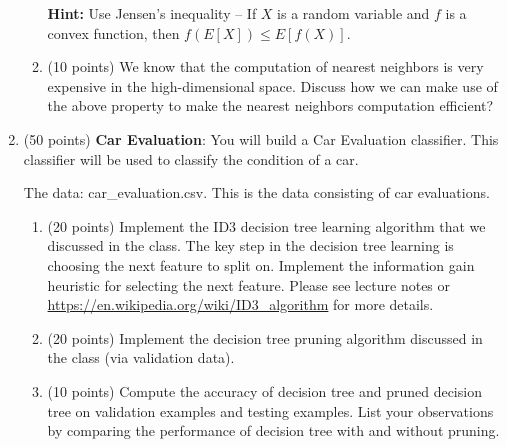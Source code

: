 \documentclass[11pt]{article}
\begin{document}
\begin{enumerate}
\begin{enumerate}
    \textbf{Hint: } Use Jensen’s inequality – If $X$ is a random
    variable and $f$ is a convex function, then $f(E[X]) \le
    E[f(X)]$.

    
    \item (10 points) We know that the computation of nearest
    neighbors is very expensive in the high-dimensional space.
    Discuss how we can make use of the above property to make the
    nearest neighbors computation efficient?


\end{enumerate}

\item (50 points) \textbf{Car Evaluation}: You will
build a Car Evaluation classifier. This classifier will be
used to classify the condition of a car.

The data: car\_evaluation.csv. This is the data
consisting of car evaluations. 

\begin{enumerate}
\item (20 points) Implement the ID3 decision tree learning
algorithm that we discussed in the class. The key step in the
decision tree learning is choosing the next feature to split on.
Implement the information gain heuristic for selecting the next
feature. Please see lecture notes or
\url{https://en.wikipedia.org/wiki/ID3_algorithm} for more
details.

\item (20 points) Implement the decision tree pruning algorithm
discussed in the class (via validation data).

\item (10 points) Compute the accuracy of decision tree and
pruned decision tree on validation examples and testing examples.
List your observations by comparing the performance of decision
tree with and without pruning.

\end{enumerate}


\end{enumerate}
\end{document}
